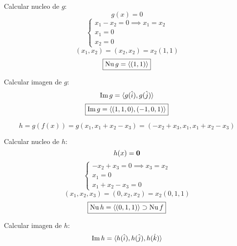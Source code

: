\documentclass[../practica.root.tex]{subfiles}
\begin{document}
\begin{enumerate}
\begin{enumerate}
                    \begin{minipage}[t]{0.5\textwidth}
                        Calcular nucleo de \(g\):
                        \[
                            g(x) = 0
                        \] \[
                            \begin{cases}
                                x_1 - x_2 = 0 \implies x_1 = x_2 \\
                                x_1 = 0                          \\
                                x_2 = 0
                            \end{cases}
                        \] \[
                            (x_1, x_2) = (x_2, x_2) = x_2(1,1)
                        \] \[
                            \boxed{\operatorname{Nu} g = \langle (1,1) \rangle}
                        \]
                    \end{minipage}
                    \begin{minipage}[t]{0.5\textwidth}
                        Calcular imagen de \(g\):
                        \[ \operatorname{Im} g = \langle g(\hat{i}),g(\hat{j}) \rangle \]
                        \[ \boxed{\operatorname{Im} g = \langle (1,1,0),(-1,0,1) \rangle} \]
                    \end{minipage}
                    \[ h = g(f(x)) = g(x_1, x_1 + x_2 - x_3) = (-x_2 + x_3, x_1, x_1 + x_2 - x_3) \]
                    \begin{minipage}[t]{0.5\textwidth}
                        Calcular nucleo de \(h\):
                        \[ h(x) = \mathbf{0} \]
                        \[
                            \begin{cases}
                                -x_2 + x_3 = 0 \implies x_3 = x_2 \\
                                x_1 = 0                           \\
                                x_1 + x_2 - x_3 = 0
                            \end{cases}
                        \] \[
                            (x_1,x_2,x_3) = (0,x_2,x_2) = x_2(0,1,1)
                        \] \[
                            \boxed{\operatorname{Nu} h = \langle (0,1,1) \rangle \supset \operatorname{Nu} f}
                        \]
                    \end{minipage}
                    \begin{minipage}[t]{0.5\textwidth}
                        Calcular imagen de \(h\):
                        \[ \operatorname{Im} h = \langle h(\hat{i}),h(\hat{j}),h(\hat{k}) \rangle \]

\end{minipage}
\end{enumerate}
\end{enumerate}
\end{document}
